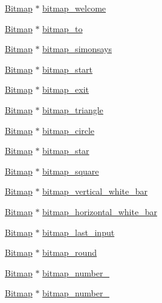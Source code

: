 \begin{DoxyCompactItemize}
\item 
\hyperlink{struct_bitmap}{Bitmap} $\ast$ \hyperlink{group___bitmap_gaf1aaa82e6e29c903bb1fda96ce708d27}{bitmap\+\_\+welcome}
\item 
\hyperlink{struct_bitmap}{Bitmap} $\ast$ \hyperlink{group___bitmap_ga5240b87601f0b5aa3e67976c3ed240ed}{bitmap\+\_\+to}
\item 
\hyperlink{struct_bitmap}{Bitmap} $\ast$ \hyperlink{group___bitmap_ga7cad4ac90d452221efb12d6156b53b22}{bitmap\+\_\+simonsays}
\item 
\hyperlink{struct_bitmap}{Bitmap} $\ast$ \hyperlink{group___bitmap_ga87c8ef496268863adc00746941f79f44}{bitmap\+\_\+start}
\item 
\hyperlink{struct_bitmap}{Bitmap} $\ast$ \hyperlink{group___bitmap_ga952f653fe87f4ca995595e2b7db6228f}{bitmap\+\_\+exit}
\item 
\hyperlink{struct_bitmap}{Bitmap} $\ast$ \hyperlink{group___bitmap_gaf81c286e8b6c034dd42b1e09dfb4c9d9}{bitmap\+\_\+triangle}
\item 
\hyperlink{struct_bitmap}{Bitmap} $\ast$ \hyperlink{group___bitmap_gac1d843b74dd56e98adf0c72f75a5a1d8}{bitmap\+\_\+circle}
\item 
\hyperlink{struct_bitmap}{Bitmap} $\ast$ \hyperlink{group___bitmap_gacf0c500ba60d2cf03c116fe731b21ec9}{bitmap\+\_\+star}
\item 
\hyperlink{struct_bitmap}{Bitmap} $\ast$ \hyperlink{group___bitmap_gaa6ea6c52c8712671d8ed350cde2f2313}{bitmap\+\_\+square}
\item 
\hyperlink{struct_bitmap}{Bitmap} $\ast$ \hyperlink{group___bitmap_ga19d13e384604a13b7d8a0839aadd9234}{bitmap\+\_\+vertical\+\_\+white\+\_\+bar}
\item 
\hyperlink{struct_bitmap}{Bitmap} $\ast$ \hyperlink{group___bitmap_ga4610248f579630fea652a3704556c74c}{bitmap\+\_\+horizontal\+\_\+white\+\_\+bar}
\item 
\hyperlink{struct_bitmap}{Bitmap} $\ast$ \hyperlink{group___bitmap_gac6d8af40b0549ee19c8d2d146ac2844f}{bitmap\+\_\+last\+\_\+input}
\item 
\hyperlink{struct_bitmap}{Bitmap} $\ast$ \hyperlink{group___bitmap_ga2f913b78a0f833c9a04aef7f4b334062}{bitmap\+\_\+round}
\item 
\hyperlink{struct_bitmap}{Bitmap} $\ast$ \hyperlink{group___bitmap_ga993712c0e2465ddf6682e1da844cb33f}{bitmap\+\_\+number\+\_}
\item 
\hyperlink{struct_bitmap}{Bitmap} $\ast$ \hyperlink{group___bitmap_gae0e099ab280db078712dae7370590d69}{bitmap\+\_\+number\+\_}

\end{DoxyCompactItemize}

